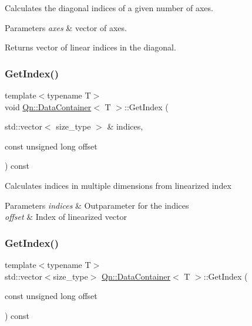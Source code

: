 Calculates the diagonal indices of a given number of axes. 
\begin{DoxyParams}{Parameters}
{\em axes} & vector of axes. \\
\hline
\end{DoxyParams}
\begin{DoxyReturn}{Returns}
vector of linear indices in the diagonal. 
\end{DoxyReturn}
\mbox{\label{classQn_1_1DataContainer_ac4cb2d0af4e28966603b97dc50e5ce50}} 
\subsubsection{\texorpdfstring{Get\+Index()}{GetIndex()}\hspace{0.1cm}{\footnotesize\ttfamily [1/2]}}
{\footnotesize\ttfamily template$<$typename T$>$ \\
void \mbox{\hyperlink{classQn_1_1DataContainer}{Qn\+::\+Data\+Container}}$<$ T $>$\+::Get\+Index (\begin{DoxyParamCaption}\item[{std\+::vector$<$ size\+\_\+type $>$ \&}]{indices,  }\item[{const unsigned long}]{offset }\end{DoxyParamCaption}) const\hspace{0.3cm}{\ttfamily [inline]}}

Calculates indices in multiple dimensions from linearized index 
\begin{DoxyParams}{Parameters}
{\em indices} & Outparameter for the indices \\
\hline
{\em offset} & Index of linearized vector \\
\hline
\end{DoxyParams}
\mbox{\label{classQn_1_1DataContainer_aa9b5b94b254a2e447b843b3bed6a9b92}} 
\subsubsection{\texorpdfstring{Get\+Index()}{GetIndex()}\hspace{0.1cm}{\footnotesize\ttfamily [2/2]}}
{\footnotesize\ttfamily template$<$typename T$>$ \\
std\+::vector$<$size\+\_\+type$>$ \mbox{\hyperlink{classQn_1_1DataContainer}{Qn\+::\+Data\+Container}}$<$ T $>$\+::Get\+Index (\begin{DoxyParamCaption}\item[{const unsigned long}]{offset }\end{DoxyParamCaption}) const\hspace{0.3cm}{\ttfamily [inline]}}


